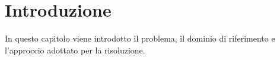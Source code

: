 \chapter{Introduzione}

In questo capitolo viene introdotto il problema, il dominio di
riferimento e l'approccio adottato per la risoluzione.
